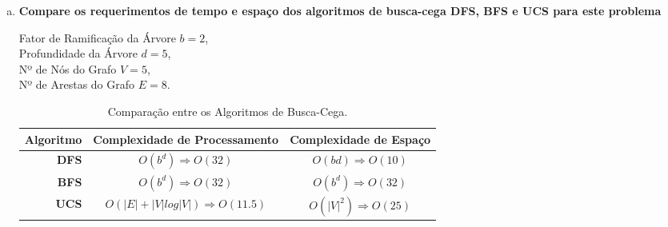 \documentclass[paper=a4, fontsize=11pt]{scrartcl} %
\begin{document}
\begin{enumerate}[(a)]
        \item \textbf{Compare os requerimentos de tempo e espaço dos algoritmos de busca-cega DFS, BFS e UCS para este problema}
        \par Fator de Ramificação da Árvore $b= 2$,\\  Profundidade da Árvore $d = 5$, \\ Nº de Nós do Grafo $V = 5$, \\ Nº de Arestas do Grafo $E = 8$. 
        \par \begin{table}[h!]
            \begin{center}
              \caption{Comparação entre os Algoritmos de Busca-Cega.}
              \label{tab:table1}
              \begin{tabular}{r|c|c} %
                \textbf{Algoritmo} & \textbf{Complexidade de Processamento} & \textbf{Complexidade de Espaço}\\
                \hline
                \textbf{DFS} & $O(b^d) \Rightarrow O(32)$ & $O(bd) \Rightarrow O(10)$ \\
                \textbf{BFS} & $O(b^d) \Rightarrow O(32)$ & $O(b^d) \Rightarrow O(32)$ \\
                \textbf{UCS} & $O(|E| + |V| log |V|) \Rightarrow O(11.5)$ & $O(|V|^2) \Rightarrow O(25)$\\
              \end{tabular}
            \end{center}
          \end{table}
        \vspace{0.2cm}


\end{enumerate}
\end{document}
